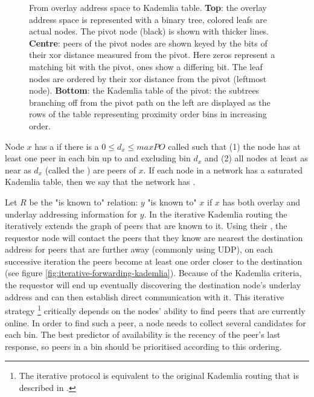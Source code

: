 \begin{figure}[htbp]
   \caption[From overlay address space to Kademlia table \statusgreen]{From overlay address space to Kademlia table. \textbf{Top}: the overlay address space is represented with a binary tree, colored leafs are actual nodes. The pivot node (black) is shown with thicker lines. \textbf{Centre}: peers of the pivot nodes are shown keyed by the bits of their xor distance measured from the pivot. Here zeros represent a matching bit with the pivot, ones show a differing bit. The leaf nodes are ordered by their xor distance from the pivot (leftmost node). \textbf{Bottom}: the Kademlia table of the pivot: the subtrees branching off from the pivot path on the left are displayed as the rows of the table representing proximity order bins in increasing order.}
   \label{fig:kademlia-table}
\end{figure}

Node $x$ has a  if there is a $0\leq d_x\leq \mathit{maxPO}$ called  such that (1) the node has at least one peer in each bin up to and excluding  bin $d_x$ and (2) all nodes at least as near as $d_x$ (called the ) are peers of $x$. If each node in a network has a saturated Kademlia table, then we say that the network has .

Let $R$ be the "is known to" relation:  $y$ "is known to" $x$ if $x$ has both overlay and underlay addressing information for $y$. 
In the iterative Kademlia routing the  iteratively extends the graph of peers that are known to it. Using their , the requestor node will contact the peers that they know are nearest the destination address for peers that are further away (commonly using UDP), on each successive iteration the peers become at least one order closer to the destination (see figure \ref{fig:iterative-forwarding-kademlia}). Because of the Kademlia criteria, the requestor will end up eventually discovering the destination node's underlay address and can then establish direct communication with it. This iterative strategy%
%
\footnote{The iterative protocol is equivalent to the original Kademlia routing that is described in \cite{maymounkov2002kademlia}.
}
%
critically depends on the nodes' ability to find peers that are currently online. In order to find such a peer, a node needs to collect several candidates for each bin. The best predictor of availability is the recency of the peer's last response, so peers in a bin should be prioritised according to this ordering.

